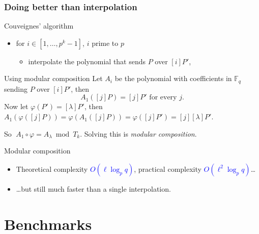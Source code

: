 \documentclass[10pt]{beamer}
\newcommand{\blue}[1]{\textcolor{blue}{#1}}  %
\newcommand{\F}{\mathbb{F}}  %
\newcommand{\frob}{\varphi}  %
\newcommand{\0}{\mathcal{O}}  %
\begin{document}

\begin{frame}
  \frametitle{Doing better than interpolation}

  \begin{block}{Couveignes' algorithm}
    \begin{itemize}
    \item for $i \in [1,\dots,p^k-1]$, $i$ prime to $p$
      \begin{itemize}
      \item interpolate the polynomial that sends $P$ over $[i]P'$,
      \end{itemize}
    \end{itemize}
  \end{block}

  \begin{block}{Using modular composition}
    Let $A_i$ be the polynomial with coefficients in $\F_q$ sending
    $P$ over $[i]P'$, then
    \[A_1([j]P) = [j]P' \text{ for every $j$.}\]
    Now let $\frob(P') = [\lambda]P'$, then $A_1(\frob([j]P)) =
    \frob(A_1([j]P)) = \frob([j]P') = [j][\lambda]P'$.

    So \alert{$\;A_1\circ\frob = A_\lambda \bmod T_k$}. Solving this
    is \emph{modular composition}.
  \end{block}

  \begin{block}{Modular composition}
    \begin{itemize}
    \item Theoretical complexity \blue{$O(\ell\log_pq)$}, practical
      complexity \blue{$O(\ell^2\log_pq)$}\dots
    \item \dots but still much faster than a single interpolation.
    \end{itemize}
  \end{block}
\end{frame}


\section{Benchmarks}
\end{document}
